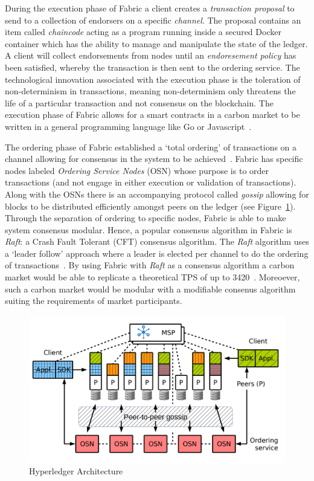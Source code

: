 During the execution phase of Fabric a client creates a \textit{transaction
    proposal} to send to a collection of endorsers on a specific
\textit{channel}. The proposal contains an item called \textit{chaincode}
acting as a program running inside a secured Docker container which has
the ability to manage and manipulate the state of the ledger.
A client will collect endorsements from nodes until an
\textit{endoresement policy} has been satisfied, whereby the transaction
is then sent to the ordering service. The technological innovation
associated with the execution phase is the toleration of
non-determinism in transactions, meaning non-determinism only threatens the
life of a particular transaction and not consensus on the blockchain.
The execution phase of Fabric allows for a smart contracts in a
carbon market to be written
in a general programming language like Go or Javascript~\cite{And18}.

The ordering phase of Fabric established a `total ordering' of transactions
on a channel allowing for consensus in the system to be achieved~\cite{And18}.
Fabric has specific nodes labeled \textit{Ordering Service Nodes} (OSN)
whose purpose is to order transactions (and not engage in either
execution or validation of transactions). Along with the OSNs there
is an accompanying protocol called \textit{gossip} allowing for blocks
to be distributed efficiently amongst peers on the ledger
(see Figure~\ref{fig:harch}). Through the separation of ordering to
specific nodes, Fabric is able to make system consensus modular.
Hence, a popular consensus algorithm in Fabric is \textit{Raft}: a Crash Fault
Tolerant (CFT) consensus algorithm. The \textit{Raft} algorithm uses
a `leader follow' approach where a leader is elected per channel to
do the ordering of transactions~\cite{raft}. By using Fabric with
\textit{Raft} as a consensus algorithm a carbon market would be able
to replicate a theoretical TPS of up to 3420~\cite{And18}. Moreoever,
such a carbon market would be modular with a modifiable consenus
algorithm suiting the requirements of market participants.

\begin{figure}[H]
    \centering
    \includegraphics[scale=0.5]{photos/hyperarch.png}
    \caption{Hyperledger Architecture}
    \label{fig:harch}
\end{figure}

